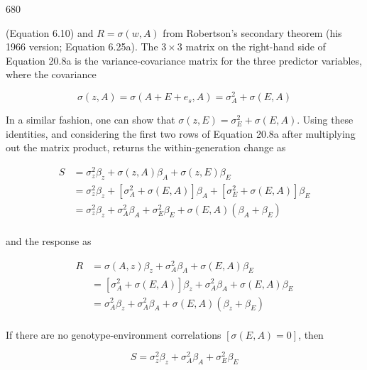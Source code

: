 \documentclass{article}
\begin{document}
680

(Equation 6.10) and  $ R = \sigma(w, A) $ from Robertson’s secondary theorem (his 1966 version; Equation 6.25a). The  $ 3 \times 3 $ matrix on the right-hand side of Equation 20.8a is the variance-covariance matrix for the three predictor variables, where the covariance

\begin{equation}
\sigma(z,A)=\sigma(A+E+e_{s},A)=\sigma_{A}^{2}+\sigma(E,A)
\tag{20.8b}
\label{eq:20_8b}
\end{equation}

In a similar fashion, one can show that  $ \sigma(z, E) = \sigma_E^2 + \sigma(E, A) $. Using these identities, and considering the first two rows of Equation 20.8a after multiplying out the matrix product, returns the within-generation change as

\begin{equation}
\begin{aligned}S&=\sigma_{z}^{2}\beta_{z}+\sigma(z,A)\beta_{A}+\sigma(z,E)\beta_{E}\\&=\sigma_{z}^{2}\beta_{z}+\left[\sigma_{A}^{2}+\sigma(E,A)\right]\beta_{A}+\left[\sigma_{E}^{2}+\sigma(E,A)\right]\beta_{E}\\&=\sigma_{z}^{2}\beta_{z}+\sigma_{A}^{2}\beta_{A}+\sigma_{E}^{2}\beta_{E}+\sigma(E,A)(\beta_{A}+\beta_{E})\\ \end{aligned}
\tag{20.9a}
\label{eq:20_9a}
\end{equation}

and the response as

\begin{equation}
\begin{aligned}R&=\sigma(A,z)\beta_{z}+\sigma_{A}^{2}\beta_{A}+\sigma(E,A)\beta_{E}\\&=\left[\sigma_{A}^{2}+\sigma(E,A)\right]\beta_{z}+\sigma_{A}^{2}\beta_{A}+\sigma(E,A)\beta_{E}\\&=\sigma_{A}^{2}\beta_{z}+\sigma_{A}^{2}\beta_{A}+\sigma(E,A)(\beta_{z}+\beta_{E})\\ \end{aligned}
\tag{20.9b}
\label{eq:20_9b}
\end{equation}

If there are no genotype-environment correlations  $ [\sigma(E,A)=0] $, then

\begin{equation}
S=\sigma_{z}^{2}\beta_{z}+\sigma_{A}^{2}\beta_{A}+\sigma_{E}^{2}\beta_{E}
\tag{20.10a}
\label{eq:20_10a}
\end{equation}
\end{document}
